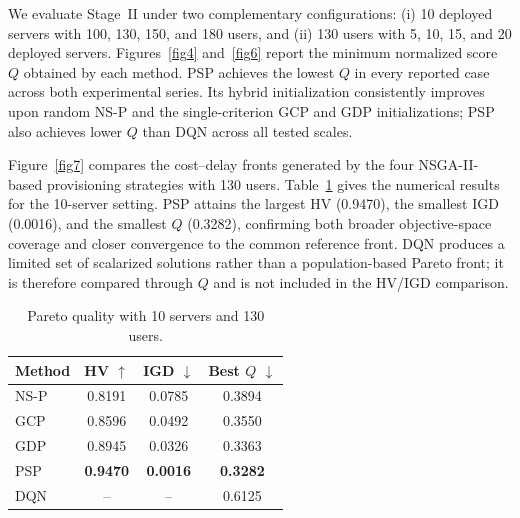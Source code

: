 \documentclass[10pt, conference, letterpaper]{IEEEtran}
\begin{document}
We evaluate Stage~II under two complementary configurations: (i) 10 deployed servers with 100, 130, 150, and 180 users, and (ii) 130 users with 5, 10, 15, and 20 deployed servers. Figures~\ref{fig4} and~\ref{fig6} report the minimum normalized score $Q$ obtained by each method. PSP achieves the lowest $Q$ in every reported case across both experimental series. Its hybrid initialization consistently improves upon random NS-P and the single-criterion GCP and GDP initializations; PSP also achieves lower $Q$ than DQN across all tested scales.

Figure~\ref{fig7} compares the cost--delay fronts generated by the four NSGA-II-based provisioning strategies with 130 users. Table~\ref{tab:pareto_metrics} gives the numerical results for the 10-server setting. PSP attains the largest HV (0.9470), the smallest IGD (0.0016), and the smallest $Q$ (0.3282), confirming both broader objective-space coverage and closer convergence to the common reference front. DQN produces a limited set of scalarized solutions rather than a population-based Pareto front; it is therefore compared through $Q$ and is not included in the HV/IGD comparison.


\begin{table}[!t]
\centering

\caption{Pareto quality with 10 servers and 130 users.}
\label{tab:pareto_metrics}
\small
\begin{tabular}{|l|c|c|c|}
\hline
Method & HV $\uparrow$ & IGD $\downarrow$ & Best $Q$ $\downarrow$ \\ \hline
NS-P & 0.8191 & 0.0785 & 0.3894 \\ \hline
GCP  & 0.8596 & 0.0492 & 0.3550 \\ \hline
GDP  & 0.8945 & 0.0326 & 0.3363 \\ \hline
PSP  & \textbf{0.9470} & \textbf{0.0016} & \textbf{0.3282} \\ \hline
DQN  & -- & -- & 0.6125 \\ \hline
\end{tabular}
\end{table}
\end{document}
